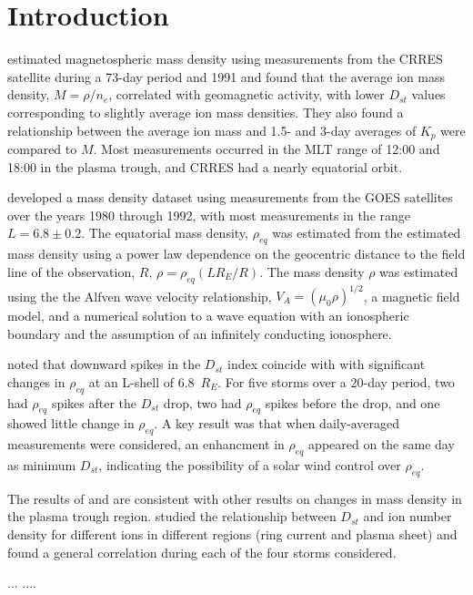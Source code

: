 \documentclass[10pt,twocolumn]{article}
\begin{document}
\section{Introduction}

\cite{Takahashi2006} estimated magnetospheric mass density using measurements from the CRRES satellite during a 73-day period and 1991 and found that the average ion mass density, $M=\rho/n_e$, correlated with geomagnetic activity, with lower $D_{st}$ values corresponding to slightly average ion mass densities.  They also found a relationship between the average ion mass and 1.5- and 3-day averages of $K_p$ were compared to $M$.  Most measurements occurred in the MLT range of 12:00 and 18:00 in the plasma trough, and CRRES had a nearly equatorial orbit.

\cite{Takahashi2010} developed a mass density dataset using measurements from the GOES satellites over the years 1980 through 1992, with most measurements in the range $L=6.8\pm0.2$. The equatorial mass density, $\rho_{eq}$ was estimated from the estimated mass density using a power law dependence on the geocentric distance to the field line of the observation, $R$, $\rho=\rho_{eq}(LR_E/R)$. The mass density $\rho$ was estimated using the the Alfven wave velocity relationship, $V_A=(\mu_0\rho)^{1/2}$, a magnetic field model, and a numerical solution to a wave equation with an ionospheric boundary and the assumption of an infinitely conducting ionosphere.  

\cite{Takahashi2010} noted that downward spikes in the $D_{st}$ index coincide with with significant changes in $\rho_{eq}$ at an L-shell of 6.8~$R_E$. For five storms over a 20-day period, two had $\rho_{eq}$ spikes after the $D_{st}$ drop, two had $\rho_{eq}$ spikes before the drop, and one showed little change in $\rho_{eq}$.  A key result was that when daily-averaged measurements were considered, an enhancment in $\rho_{eq}$ appeared on the same day as minimum $D_{st}$, indicating the possibility of a solar wind control over $\rho_{eq}$.

The results of \cite{Takahashi2006} and \cite{Takahashi2010} are consistent with other results on changes in mass density in the plasma trough region.  \cite{Yao2008} studied the relationship between $D_{st}$ and ion number density for different ions in different regions (ring current and plasma sheet) and found a general correlation during each of the four storms considered.

\cite{Hamilton1988} ... \cite{Gallagher1988} .... 
\end{document}
